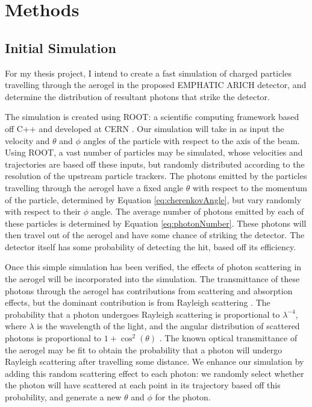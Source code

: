 
\chapter{Methods}
\label{ch:Methods}

\section{Initial Simulation}
\label{sec:experiment}
For my thesis project, I intend to create a fast simulation of charged particles travelling through the aerogel in the proposed \ac{EMPHATIC} \ac{ARICH} detector, and determine the distribution of resultant photons that strike the detector. 

The simulation is created using \textsc{ROOT}: a scientific computing framework based off C++ and developed at CERN \cite{root}.
Our simulation will take in as input the velocity and $\theta$ and $\phi$ angles of the particle with respect to the axis of the beam.
Using \textsc{ROOT}, a vast number of particles may be simulated, whose velocities and trajectories are based off these inputs, but randomly distributed according to the resolution of the upstream particle trackers.
The photons emitted by the particles travelling through the aerogel have a fixed angle $\theta$ with respect to the momentum of the particle, determined by Equation \ref{eq:cherenkovAngle}, but vary randomly with respect to their $\phi$ angle.
The average number of photons emitted by each of these particles is determined by Equation \ref{eq:photonNumber}.
These photons will then travel out of the aerogel and have some chance of striking the detector.
The detector itself has some probability of detecting the hit, based off its efficiency. 


Once this simple simulation has been verified, the effects of photon scattering in the aerogel will be incorporated into the simulation.
The transmittance of these photons through the aerogel has contributions from scattering and absorption effects, but the dominant contribution is from Rayleigh scattering \cite{aerogelRefraction}.
The probability that a photon  undergoes Rayleigh scattering is proportional to $\lambda^{-4}$, where $\lambda$ is the wavelength of the light, and the angular distribution of scattered photons is proportional to $1 + \cos^2(\theta)$ \cite{rayleigh}.
The known optical transmittance of the aerogel \cite{aerogelRefraction} may be fit to obtain the probability that a photon will undergo Rayleigh scattering after travelling some distance.
We enhance our simulation by adding this random scattering effect to each photon: we randomly select whether the photon will have scattered at each point in its trajectory based off this probability, and generate a new $\theta$ and $\phi$ for the photon. 

